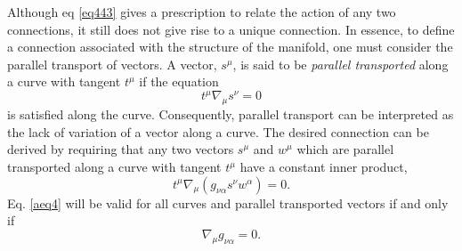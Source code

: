 \documentclass[
12pt,		%
openright,	%
twoside,  %
a4paper,			%
chapter=TITLE,		%
english,			%
french,				%
spanish,			%
brazil				%
]{USPSC-classe/USPSC}
\begin{document}
\begin{apendicesenv}
Although eq \ref{eq443} gives a prescription to relate the action of any two connections, it still does not give rise to a unique connection. In essence, to define a connection associated with the structure of the manifold, one must consider the parallel transport of vectors. A vector, $s^{\mu}$, is said to be \textit{parallel transported} along a curve with tangent $t^{\mu}$ if the equation
\begin{equation}\label{aeq33}
t^{\mu}\nabla_{\mu}s^{\nu}=0
\end{equation}
is satisfied along the curve. Consequently, parallel transport can be interpreted as the lack of variation of a vector along a curve. The desired connection can be derived by requiring that any two vectors $s^{\mu}$ and $w^{\mu}$ which are parallel transported along a curve with tangent $t^{\mu}$ have a constant inner product,
\begin{equation}\label{aeq4}
t^{\mu}\nabla_{\mu}(g_{\nu\alpha}s^{\nu}w^{\alpha})=0.
\end{equation}
Eq. \ref{aeq4} will be valid for all curves and parallel transported vectors if and only if
\begin{equation}\label{aeq5}
\nabla_{\mu}g_{\nu\alpha}=0.
\end{equation}


\end{apendicesenv}
\end{document}
